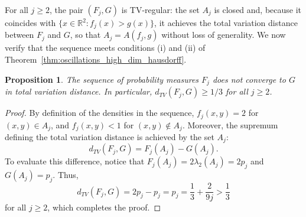 \documentclass[12pt]{article}
\newtheorem{proposition}{Proposition}
\newcommand{\RR}{\mathbb{R}}
\begin{document}
For all $j\geq 2$, the pair $(F_j,G)$ is TV-regular: the set $A_j$ is closed and,
because it coincides with $\{x\in\RR^2 : f_j(x)>g(x)\}$, it achieves the total variation distance
between $F_j$ and $G$, so that $A_j = A(f_j,g)$ without loss of generality. We now verify that the sequence meets conditions
(i) and (ii) of Theorem~\ref{thm:oscillations_high_dim_hausdorff}.

\begin{proposition}\label{prop:no_tv}
The sequence of probability measures $F_j$ does not converge to $G$ in total variation distance. In particular, $d_{TV}(F_j,G)\geq 1/3$ for all $j\geq 2$.
\end{proposition}
\begin{proof}
By definition of the densities in the sequence, $f_j(x,y) = 2$ for $(x,y) \in A_j$, and $f_j(x,y) < 1$ for
$(x,y) \notin A_j$. Moreover, the supremum defining the total variation distance is achieved
by the set $A_j$:
\begin{equation*}
    d_{TV}(F_j, G) = F_j(A_j) - G(A_j).
\end{equation*}
To evaluate this difference, notice that $F_j(A_j) = 2 \lambda_2(A_j) = 2p_j$ and $G(A_j) = p_j$. Thus,
\begin{equation*}
    d_{TV}(F_j, G) = 2p_j - p_j = p_j = \frac{1}{3} + \frac{2}{9j}>\frac{1}{3}
\end{equation*}
for all $j\ge 2$, which completes the proof.
\end{proof}
\end{document}
